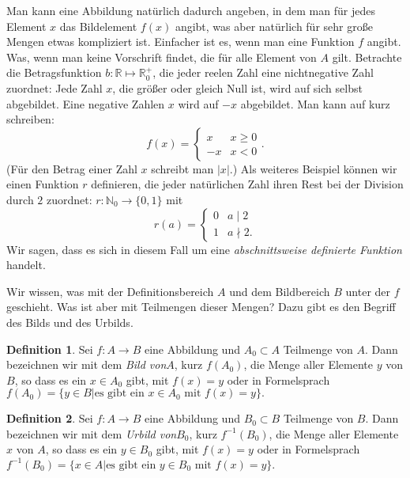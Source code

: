 \documentclass[a4paper,ngerman,12pt]{scrartcl}
\theoremstyle{definition}
\newtheorem{defn}{Definition}[section]
\theoremstyle{plain}
\theoremstyle{remark}
\begin{document}
Man kann eine Abbildung natürlich dadurch angeben, in dem man für jedes Element $x$ das Bildelement $f(x)$ angibt, was aber natürlich für sehr große Mengen etwas kompliziert ist. Einfacher ist es,
wenn man eine Funktion $f$ angibt. Was, wenn man keine Vorschrift findet, die für alle Element von $A$ gilt. Betrachte die Betragsfunktion $b:\mathbb{R} \mapsto \mathbb{R}^+_0$, die jeder reelen Zahl eine nichtnegative Zahl zuordnet: Jede Zahl $x$, die größer oder gleich Null ist, wird auf sich selbst abgebildet. Eine negative Zahlen $x$ wird auf $-x$ abgebildet. Man kann auf kurz schreiben:
\[ f(x) =\begin{cases} 
      x & x\geq 0 \\
      -x & x < 0
   \end{cases}.
\] (Für den Betrag einer Zahl $x$ schreibt man $|x|$.) 
Als weiteres Beispiel können wir einen Funktion $r$ definieren, die jeder natürlichen Zahl ihren Rest bei der Division durch $2$ zuordnet: $r:\mathbb{N}_0 \longrightarrow \{0,1\}$ mit
\[ r(a) = 
\begin{cases}
0 & a\mid 2 \\
1 & a\nmid 2.
\end{cases}
\] 
Wir sagen, dass es sich in diesem Fall um eine  \emph{abschnittsweise definierte Funktion} handelt.

Wir wissen, was mit der Definitionsbereich $A$ und dem Bildbereich $B$ unter der $f$ geschieht. Was ist aber mit Teilmengen dieser Mengen? Dazu gibt es den Begriff des Bilds und des Urbilds.

\begin{defn}
Sei $f:A\longrightarrow B$ eine Abbildung und $A_0\subset A$ Teilmenge von $A$. Dann bezeichnen wir mit dem \emph{Bild von}$A$, kurz $f(A_0)$, die Menge aller Elemente 
$y$ von $B$, so dass es ein $x\in A_0$ gibt, mit $f(x)=y$ oder in Formelsprach
$f(A_0) = \{y\in B|\text{es gibt ein } x\in A_0 \text{ mit } f(x) =y\}.$ 
\end{defn}

\begin{defn}
Sei $f:A\longrightarrow B$ eine Abbildung und $B_0\subset B$ Teilmenge von $B$. Dann bezeichnen wir mit dem \emph{Urbild von}$B_0$, kurz $f^{-1}(B_0)$, die Menge aller Elemente 
$x$ von $A$, so dass es ein $y\in B_0$ gibt, mit $f(x)=y$ oder in Formelsprach
$f^{-1}(B_0) = \{x\in A|\text{es gibt ein } y\in B_0 \text{ mit } f(x) =y\}.$ 
\end{defn}
\end{document}
